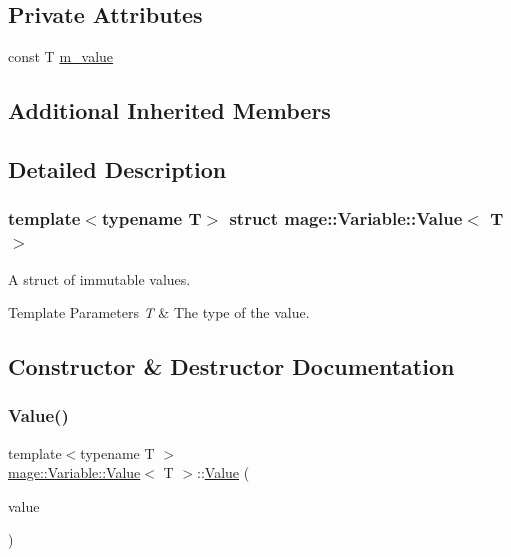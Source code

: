 \subsection*{Private Attributes}
\begin{DoxyCompactItemize}
\item 
const T \hyperlink{structmage_1_1_variable_1_1_value_a338caf846aa4dc87caf2620fa94b5369}{m\+\_\+value}
\end{DoxyCompactItemize}
\subsection*{Additional Inherited Members}


\subsection{Detailed Description}
\subsubsection*{template$<$typename T$>$\newline
struct mage\+::\+Variable\+::\+Value$<$ T $>$}

A struct of immutable values.


\begin{DoxyTemplParams}{Template Parameters}
{\em T} & The type of the value. \\
\hline
\end{DoxyTemplParams}


\subsection{Constructor \& Destructor Documentation}
\hypertarget{structmage_1_1_variable_1_1_value_a36aa54fe0b4e80228e7dbee545d9cb38}{}\label{structmage_1_1_variable_1_1_value_a36aa54fe0b4e80228e7dbee545d9cb38} 
\subsubsection{\texorpdfstring{Value()}{Value()}\hspace{0.1cm}{\footnotesize\ttfamily [1/3]}}
{\footnotesize\ttfamily template$<$typename T $>$ \\
\hyperlink{structmage_1_1_variable_1_1_value}{mage\+::\+Variable\+::\+Value}$<$ T $>$\+::\hyperlink{structmage_1_1_variable_1_1_value}{Value} (\begin{DoxyParamCaption}\item[{const T \&}]{value }\end{DoxyParamCaption})\hspace{0.3cm}{\ttfamily [explicit]}}

